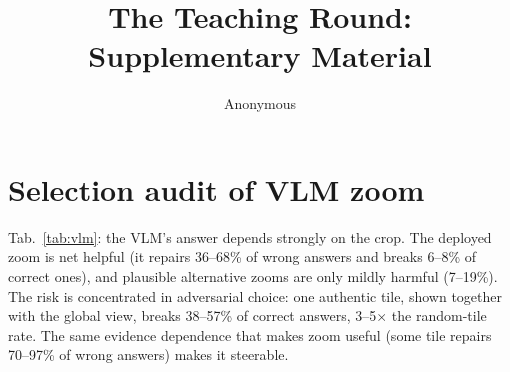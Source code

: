 \documentclass[10pt,twocolumn,letterpaper]{article}
\title{The Teaching Round: Supplementary Material}
\author{Anonymous}
\begin{document}
\maketitle
\section{Selection audit of VLM zoom}
\begin{table}[t]\centering\small
\caption{\textbf{VLM zoom transitions} relative to the global-view answer (95\% bootstrap CI). Adversarial = best-of all grid tiles (white-box option scores); realized = the model's own grounding zoom.}\label{tab:vlm}
\setlength{\tabcolsep}{2.5pt}
\end{table}

Tab.~\ref{tab:vlm}: the VLM's answer depends strongly on the crop. The deployed zoom is net helpful (it repairs 36--68\% of wrong answers and breaks 6--8\% of correct ones), and plausible alternative zooms are only mildly harmful (7--19\%). The risk is concentrated in adversarial choice: one authentic tile, shown together with the global view, breaks 38--57\% of correct answers, 3--5$\times$ the random-tile rate. The same evidence dependence that makes zoom useful (some tile repairs 70--97\% of wrong answers) makes it steerable.
\end{document}
